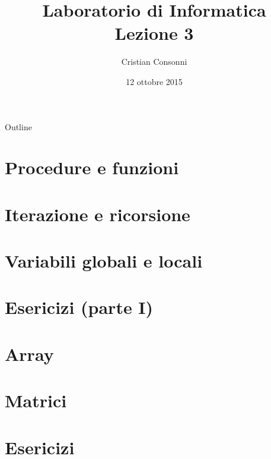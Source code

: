 \documentclass[10pt]{beamer}
\title[Laboratorio di Informatica - Lezione 3]{Laboratorio di Informatica \\ Lezione 3}
\author[Cristian Consonni]{Cristian Consonni}
\date[12/10/2015]{12 ottobre 2015}
\institute[UniTN]{Università degli Studi di Trento}
\begin{document}
\begin{frame}
  \titlepage
\end{frame}

\begin{frame}{Outline}
  \tableofcontents
\end{frame}



\section{Procedure e funzioni}


\section{Iterazione e ricorsione}


\section{Variabili globali e locali}


\section{Esericizi (parte I)}


\section{Array}


\section{Matrici}


\section{Esericizi}



% 
\end{document}
